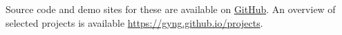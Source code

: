 \documentclass[line, margin]{res}
\begin{document}
\begin{resume}
        Source code and demo sites for these are available on \href{https://github.com/gyng}{GitHub}. An overview of selected projects is available \href{https://gyng.github.io/projects}{https://gyng.github.io/projects}.

\end{resume}
\end{document}
